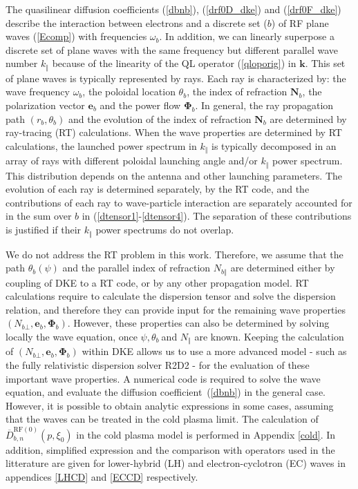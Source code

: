 
The quasilinear diffusion coefficients (\ref{dbnb}),
(\ref{drf0D_dke}) and (\ref{drf0F_dke}) describe the interaction
between electrons and a discrete set ($b$) of RF plane waves
(\ref{Ecomp}) with frequencies $\omega_{b}$. In addition, we can
linearly superpose a discrete set of plane waves with the same
frequency but different parallel wave number $k_{\Vert}$ because of
the linearity of the QL operator (\ref{qloporig}) in $\mathbf{k}$.
This set of plane waves is typically represented by rays. Each ray
is characterized by: the wave frequency $\omega_{b}$, the poloidal
location $\theta_{b}$, the index of refraction $\mathbf{N}_{b}$, the
polarization vector $\mathbf{e}_{b}$ and the power flow
$\mathbf{\Phi}_{b}$. In general, the ray propagation path $\left(
r_{b},\theta_{b}\right) $ and the evolution of the index of
refraction $\mathbf{N}_{b}$ are determined by ray-tracing (RT)
calculations. When the wave properties are determined by RT
calculations, the launched power spectrum in $k_{\Vert}$ is
typically decomposed in an array of rays with different poloidal
launching angle and/or $k_{\Vert}$ power spectrum. This distribution
depends on the antenna and other launching parameters. The evolution
of each ray is determined separately, by the RT code, and the
contributions of each ray to wave-particle interaction are
separately accounted for in the sum over $b$ in
(\ref{dtensor1}-\ref{dtensor4}). The separation of these
contributions is justified if their $k_{\Vert}$ power spectrums do
not overlap.

We do not address the RT problem in this work. Therefore, we assume that the
path $\theta_{b}\left(  \psi\right)  $ and the parallel index of refraction
$N_{b\Vert}$ are determined either by coupling of DKE to a RT code, or by any
other propagation model. RT calculations require to calculate the dispersion
tensor and solve the dispersion relation, and therefore they can provide input
for the remaining wave properties $\left(  N_{b\bot},\mathbf{e}_{b}%
,\mathbf{\Phi}_{b}\right)  $. However, these properties can also be determined
by solving locally the wave equation, once $\psi,\theta_{b}\ $and $N_{\Vert}$
are known. Keeping the calculation of $\left(  N_{b\bot},\mathbf{e}%
_{b},\mathbf{\Phi}_{b}\right)  $ within DKE allows us to use a more advanced
model - such as the fully relativistic dispersion solver R2D2 - for the
evaluation of these important wave properties. A numerical code is required to
solve the wave equation, and evaluate the diffusion coefficient\ (\ref{dbnb})
in the general case. However, it is possible to obtain analytic expressions in
some cases, assuming that the waves can be treated in the cold plasma limit.
The calculation of $\overline{D}_{b,n}^{\text{RF}(0)}(p,\xi_{0})$ in the cold
plasma model is performed in Appendix \ref{cold}. In addition, simplified
expression and the comparison with operators used in the litterature are given
for lower-hybrid (LH) and electron-cyclotron (EC) waves in appendices
\ref{LHCD} and \ref{ECCD} respectively.

